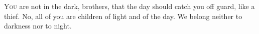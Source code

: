 
\lettrine{Y}{ou} are not in the dark, brothers, that the day should catch you off guard, like a thief. No, all of you are children of light and of the day. We belong neither to darkness nor to night.